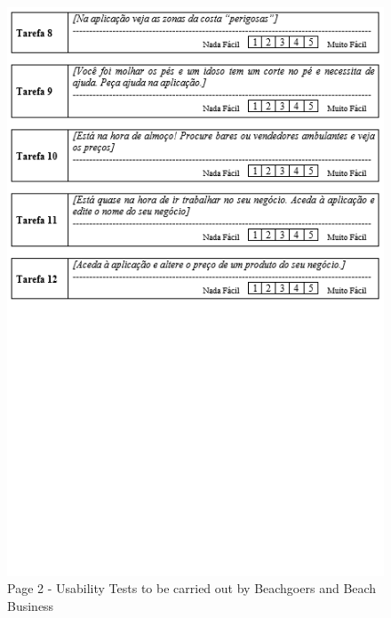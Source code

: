 \begin{figure}[H]
      \centering
      \includegraphics[width=14cm]{figs/UsabilityTest_Beachgoers_2.png}
      \caption{Page 2 - Usability Tests to be carried out by Beachgoers and Beach Business}
      \label{fig:UsabilityTest_Beachgoers_2}
\end{figure}


